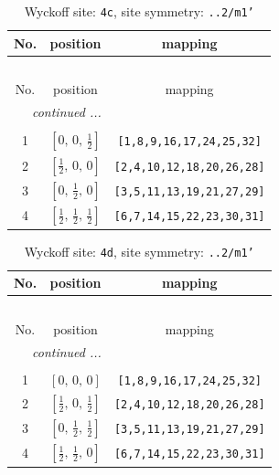 \documentclass[fleqn,8pt]{jsarticle}
\begin{document}
\renewcommand{\arraystretch}{1.2}
\begin{longtable}{ccc}
\caption{Wyckoff site: {\tt 4c}, site symmetry: {\tt ..2/m1'}}
 \\
 \hline \hline
No. & position & mapping \\ \hline \endfirsthead

\multicolumn{2}{l}{\tablename\ \thetable{}} \\
 \hline \hline
No. & position & mapping \\ \hline \endhead

 \hline \hline
\multicolumn{2}{r}{\footnotesize\it continued ...} \\ \endfoot

 \hline \hline
\multicolumn{2}{r}{} \\ \endlastfoot

1 & $\left[ 0,\, 0,\, \frac{1}{2} \right]$ & {\tt [1,8,9,16,17,24,25,32]} \\ \hline
2 & $\left[ \frac{1}{2},\, 0,\, 0 \right]$ & {\tt [2,4,10,12,18,20,26,28]} \\ \hline
3 & $\left[ 0,\, \frac{1}{2},\, 0 \right]$ & {\tt [3,5,11,13,19,21,27,29]} \\ \hline
4 & $\left[ \frac{1}{2},\, \frac{1}{2},\, \frac{1}{2} \right]$ & {\tt [6,7,14,15,22,23,30,31]} \\
\end{longtable}
\renewcommand{\arraystretch}{1.2}
\begin{longtable}{ccc}
\caption{Wyckoff site: {\tt 4d}, site symmetry: {\tt ..2/m1'}}
 \\
 \hline \hline
No. & position & mapping \\ \hline \endfirsthead

\multicolumn{2}{l}{\tablename\ \thetable{}} \\
 \hline \hline
No. & position & mapping \\ \hline \endhead

 \hline \hline
\multicolumn{2}{r}{\footnotesize\it continued ...} \\ \endfoot

 \hline \hline
\multicolumn{2}{r}{} \\ \endlastfoot

1 & $\left[ 0,\, 0,\, 0 \right]$ & {\tt [1,8,9,16,17,24,25,32]} \\ \hline
2 & $\left[ \frac{1}{2},\, 0,\, \frac{1}{2} \right]$ & {\tt [2,4,10,12,18,20,26,28]} \\ \hline
3 & $\left[ 0,\, \frac{1}{2},\, \frac{1}{2} \right]$ & {\tt [3,5,11,13,19,21,27,29]} \\ \hline
4 & $\left[ \frac{1}{2},\, \frac{1}{2},\, 0 \right]$ & {\tt [6,7,14,15,22,23,30,31]} \\
\end{longtable}
\end{document}
